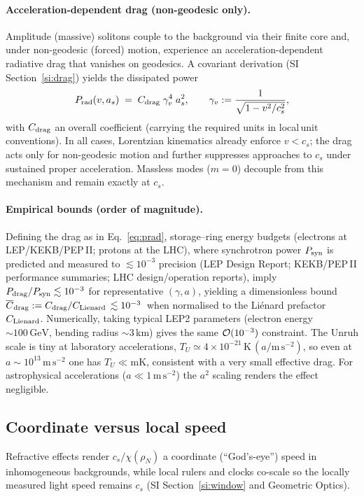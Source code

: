 \documentclass[11pt]{article}
\begin{document}
\paragraph{Acceleration-dependent drag (non-geodesic only).} Amplitude (massive) solitons couple to the background via their finite core and, under non-geodesic (forced) motion, experience an acceleration-dependent radiative drag that vanishes on geodesics. A covariant derivation (SI Section~\ref{si:drag}) yields the dissipated power
\begin{equation}
  P_{\rm rad}(v,a_s) \;=\; C_{\rm drag}\; \gamma_v^{4}\; a_s^{2},\qquad \gamma_v := \frac{1}{\sqrt{1-v^2/c_s^2}},\label{eq:prad}
\end{equation}
with $C_{\rm drag}$ an overall coefficient (carrying the required units in local\,unit conventions). In all cases, Lorentzian kinematics already enforce $v<c_s$; the drag acts only for non-geodesic motion and further suppresses approaches to $c_s$ under sustained proper acceleration. Massless modes ($m=0$) decouple from this mechanism and remain exactly at $c_s$.

\paragraph{Empirical bounds (order of magnitude).} Defining the drag as in Eq.~\eqref{eq:prad}, storage--ring energy budgets (electrons at LEP/KEKB/PEP\,II; protons at the LHC), where synchrotron power $P_{\rm syn}$ is predicted and measured to $\lesssim 10^{-3}$ precision (LEP Design Report; KEKB/PEP\,II performance summaries; LHC design/operation reports), imply $P_{\rm drag}/P_{\rm syn}\lesssim 10^{-3}$ for representative $(\gamma,a)$, yielding a dimensionless bound \,$\overline C_{\rm drag}:=C_{\rm drag}/C_{\rm Lienard}\,\lesssim 10^{-3}$\, when normalised to the Liénard prefactor $C_{\rm Lienard}$. Numerically, taking typical LEP2 parameters (electron energy $\sim\!100\,\mathrm{GeV}$, bending radius $\sim\!3\,\mathrm{km}$) gives the same ${\cal O}(10^{-3})$ constraint. The Unruh scale is tiny at laboratory accelerations, $T_U\simeq 4\times10^{-21}\,\mathrm K\,(a/\mathrm{m\,s^{-2}})$, so even at $a\sim10^{13}\,\mathrm{m\,s^{-2}}$ one has $T_U\ll\mathrm{mK}$, consistent with a very small effective drag. For astrophysical accelerations ($a\ll1\,\mathrm{m\,s^{-2}}$) the $a^{2}$ scaling renders the effect negligible.

\subsection{Coordinate versus local speed}
Refractive effects render $c_s/\chi(\rho_N)$ a coordinate (``God's-eye'') speed in inhomogeneous backgrounds, while local rulers and clocks co-scale so the locally measured light speed remains $c_s$ (SI Section~\ref{si:window} and Geometric Optics).
\end{document}
